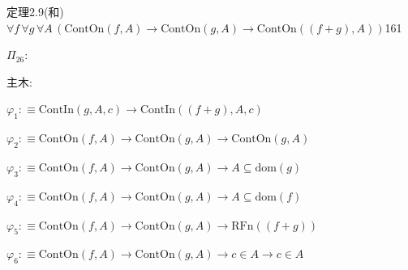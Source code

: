 \begin{fullproof}{定理2.9(和)}{$\forall f\,\forall g\,\forall A\,(\mathrm{ContOn}(f,A) \to \mathrm{ContOn}(g,A) \to \mathrm{ContOn}((f + g),A))$}{161}
\begin{ptree}
\noLine
{}
\end{ptree}
\noindent$\Pi_{26}$:
\begin{ptree}
\end{ptree}
\noindent 主木:
\begin{ptree}
\noLine
{}
\noLine
{}
\noLine
{}
\noLine
{}
\end{ptree}
\begin{abbrevlist}
\item $\varphi_{1} :\equiv \mathrm{ContIn}(g,A,c) \to \mathrm{ContIn}((f + g),A,c)$
\item $\varphi_{2} :\equiv \mathrm{ContOn}(f,A) \to \mathrm{ContOn}(g,A) \to \mathrm{ContOn}(g,A)$
\item $\varphi_{3} :\equiv \mathrm{ContOn}(f,A) \to \mathrm{ContOn}(g,A) \to A \subseteq \mathrm{dom}(g)$
\item $\varphi_{4} :\equiv \mathrm{ContOn}(f,A) \to \mathrm{ContOn}(g,A) \to A \subseteq \mathrm{dom}(f)$
\item $\varphi_{5} :\equiv \mathrm{ContOn}(f,A) \to \mathrm{ContOn}(g,A) \to \mathrm{RFn}((f + g))$
\item $\varphi_{6} :\equiv \mathrm{ContOn}(f,A) \to \mathrm{ContOn}(g,A) \to c \in A \to c \in A$

\end{abbrevlist}
\end{fullproof}
